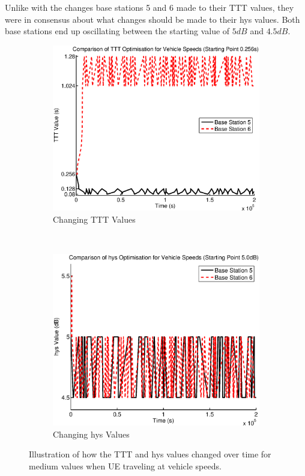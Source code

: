 Unlike with the changes base stations 5 and 6 made to their TTT values, they were in consensus about what changes should be made to their hys values. Both base stations end up oscillating between the starting value of $5 dB$ and $4.5 dB$.
\begin{figure}[H]
        \centering
        \begin{subfigure}[b]{0.49\textwidth}
                \includegraphics[width=\textwidth]{figures/vehicle_figures/mid/long_ttt.eps}
                \caption{Changing TTT Values}
                \label{fig:veh_mid_ttt}
        \end{subfigure}%
        ~ %
        \begin{subfigure}[b]{0.49\textwidth}
                \includegraphics[width=\textwidth]{figures/vehicle_figures/mid/long_hys.eps}
                \caption{Changing hys Values}
                \label{fig:veh_mid_hys}
        \end{subfigure}
        \caption{Illustration of how the TTT and hys values changed over time for medium values when UE traveling at vehicle speeds.}\label{fig:veh_mid_ttthys}
\end{figure}
